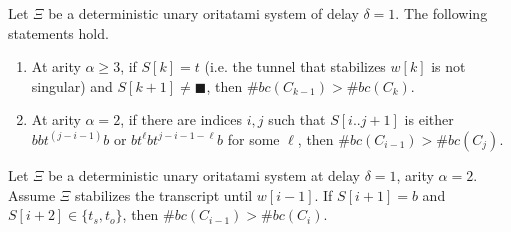 

\begin{theorem}
Let $\Xi$ be a deterministic unary oritatami system of delay $\delta = 1$. The following statements hold.
\begin{enumerate}
\item At arity $\alpha \geq 3$, if $S[k] = t$ (i.e. the tunnel that stabilizes $w[k]$ is not singular) and $S[k+1] \neq \blacksquare$, then $\#bc(C_{k-1}) > \#bc(C_k)$.
\item At arity $\alpha = 2$, if there are indices $i,j$ such that $S[i..j+1]$ is either $bbt^{(j-i-1)}b$ or $bt^\ell bt^{j-i-1-\ell}b$ for some $\ell$, then $\#bc(C_{i-1}) > \#bc(C_j)$.
\end{enumerate}
\end{theorem}


\begin{lemma}
\label{TTT_entrance_Tab}
Let $\Xi$ be a deterministic unary oritatami system at delay $\delta = 1$, arity $\alpha =2$. 
Assume $\Xi$ stabilizes the transcript until $w[i-1]$. If $S[i+1] = b$ and $S[i+2] \in \{ t_s, t_o \} $, then $\#bc(C_{i-1}) > \#bc(C_{i})$.
\end{lemma}

